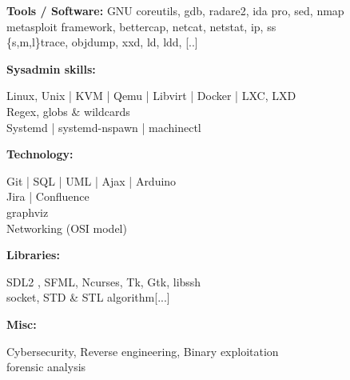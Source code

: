 \documentclass[a4paper,10pt]{article}
\begin{document}
\begin{adjustbox}{valign=t}
\begin{minipage}{0.6\textwidth}
\begin{description}
\begin{spacing}{1.0}
\item{\textbf{Tools / Software:}}
    GNU coreutils, gdb, radare2, ida pro, sed, nmap\\
    metasploit framework, bettercap, netcat, netstat, ip, ss\\
    \{s,m,l\}trace, objdump, xxd, ld, ldd, {[..]}

\item{\textbf{Sysadmin skills:}}

    Linux, Unix | KVM | Qemu | Libvirt | Docker | LXC, LXD\\
    Regex, globs \& wildcards\\
    Systemd | systemd-nspawn | machinectl

\item{\textbf{Technology:}}

    Git | SQL | UML | Ajax | Arduino\\
    Jira | Confluence\\
    graphviz\\
    Networking (OSI model)

\item{\textbf{Libraries:}}

    SDL2 , SFML, Ncurses, Tk, Gtk, libssh\\
    socket, STD \& STL algorithm{[...]}

\item{\textbf{Misc:}}

    Cybersecurity, Reverse engineering, Binary exploitation\\
    forensic analysis

\vspace{-1.5\baselineskip}
\end{spacing}
\end{description}






\end{minipage}
\end{adjustbox}
\end{document}
